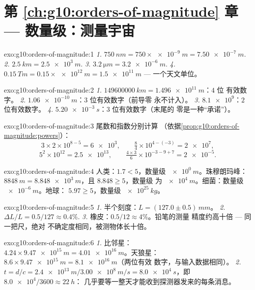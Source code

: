 \section*{第 \ref{ch:g10:orders-of-magnitude} 章 --- 数量级：测量宇宙}

\begin{solution}{exo:g10:orders-of-magnitude:1}
\emph{1.} $\qty{750}{nm} = 750 \times \qty{e-9}{m} = \qty{7.50e-7}{m}$.
\emph{2.} $\qty{2.5}{km} = \qty{2.5e3}{m}$.
\emph{3.} $\qty{3.2}{\micro m} = \qty{3.2e-6}{m}$.
\emph{4.} $\qty{0.15}{Tm} = 0.15 \times \qty{e12}{m} = \qty{1.5e11}{m}$
--- 一个天文单位。
\end{solution}

\begin{solution}{exo:g10:orders-of-magnitude:2}
\emph{1.} $\qty{149600000}{km} = \qty{1.496e11}{m}$：$4$ 位
有效数字。
\emph{2.} $\qty{1.06e-10}{m}$：$3$ 位有效数字（前导零
永不计入）。
\emph{3.} $\num{8.1e9}$：$2$ 位有效数字。
\emph{4.} $\qty{5.20e-3}{s}$：$3$ 位有效数字（末尾的
零是一种“承诺”）。
\end{solution}

\begin{solution}{exo:g10:orders-of-magnitude:3}
尾数和指数分别计算
（依据\cref{prop:g10:orders-of-magnitude:powers}）：
\[
3 \times 2 \times 10^{8-5} = \num{6e3}, \qquad
\tfrac{8}{4} \times 10^{4-(-3)} = \num{2e7},
\]
\[
5^{2} \times 10^{12} = \num{2.5e13}, \qquad
\tfrac{4 \times 3}{6} \times 10^{-3-9+7} = \num{2e-5} .
\]
\end{solution}

\begin{solution}{exo:g10:orders-of-magnitude:4}
人类：$1.7 < 5$，数量级 $\qty{e0}{m}$。珠穆朗玛峰：
$\qty{8848}{m} = \qty{8.848e3}{m}$，且 $8.848 \geq 5$，数量级
为 $\qty{e4}{m}$。细菌：数量级 $\qty{e-6}{m}$。地球：
$5.97 \geq 5$，数量级 $\qty{e25}{kg}$。
\end{solution}

\begin{solution}{exo:g10:orders-of-magnitude:5}
\emph{1.} 半个刻度：$L = (127.0 \pm 0.5)\,\unit{mm}$。
\emph{2.} $\Delta L / L = 0.5/127 \approx 0.4\%$.
\emph{3.} 橡皮：$0.5/12 \approx 4\%$。铅笔的测量
精度约高十倍 --- 同一把尺，绝对
不确定度相同，被测物体长十倍。
\end{solution}

\begin{solution}{exo:g10:orders-of-magnitude:6}
\emph{1.} 比邻星：
$4.24 \times \qty{9.47e15}{m} = \qty{4.01e16}{m}$。天狼星：
$8.6 \times \qty{9.47e15}{m} = \qty{8.1e16}{m}$（两位有效
数字，与输入数据相同）。
\emph{2.} $t = d/c = \qty{2.4e13}{m} / \qty{3.00e8}{m/s}
= \qty{8.0e4}{s}$，即 $\num{8.0e4}/3600 \approx \qty{22}{h}$：
几乎要等一整天才能收到探测器发来的每条消息。
\end{solution}


